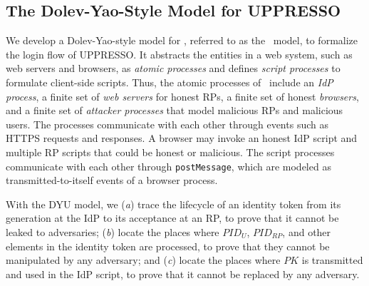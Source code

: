 

\subsection{The Dolev-Yao-Style Model for UPPRESSO}
\label{dy-model}
We develop a Dolev-Yao-style model \cite{SPRESSO} for \usso, referred to as the \dyu~model, to formalize the login flow of UPPRESSO. %
It abstracts the entities in a web system, such as web servers and browsers, as \emph{atomic processes} %
and defines \emph{script processes} to formulate client-side scripts.
Thus, the atomic processes of \usso~include an {\em IdP process}, a finite set of {\em web servers} for honest RPs, a finite set of honest {\em browsers}, and a finite set of {\em attacker processes} that model malicious RPs and malicious users. The processes communicate with each other through events such as HTTPS requests and responses.
A browser may invoke an honest IdP script and multiple RP scripts that could be honest or malicious.
The script processes communicate with each other through \verb+postMessage+, which are modeled as transmitted-to-itself events of a browser process.

\newc
With the DYU model, we (\emph{a}) trace the lifecycle of an identity token from its generation at the IdP to its acceptance at an RP, to prove that it cannot be leaked to adversaries;
(\emph{b}) locate the places where $PID_U$, $PID_{RP}$, and other elements in the identity token are processed,
 to prove that they cannot be manipulated by any adversary; and (\emph{c}) locate the places
  where $PK$ is transmitted and used in the IdP script,
to prove that it cannot be replaced by any adversary.

